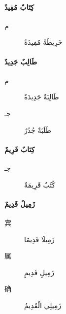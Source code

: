 \begin{Arabic}
    \begin{multicols}{3}
    \begin{minipage}{\linewidth}
    \paragraph{كِتَابٌ مُفِيدٌ}
    \begin{description}
        \item [م] خَرِيطَةٌ مُفِيدَةٌ
    \end{description}
    \end{minipage}

    \begin{minipage}{\linewidth}
    \paragraph{طَالِبٌ جَدِيدٌ}
    \begin{description}
        \item [م] طَالِبَةٌ جَدِيدَةٌ
        \item [جـ] طَلَبَةٌ جُدُرٌ
    \end{description}
    \end{minipage}

    \begin{minipage}{\linewidth}
    \paragraph{كِتَابٌ قَرِيمٌ}
    \begin{description}
        \item [جـ] كُتُبٌ قَرِيمَةٌ
    \end{description}
    \end{minipage}

    \begin{minipage}{\linewidth}
    \paragraph{زَمِيلٌ قَدِيمٌ}
    \begin{description}
        \item [宾] زَمِيلََا قَدِيمََا
        \item [属] زَمِيلِِ قَدِيمِِ
        \item [确] زَمِيلِي الْقَدِيمُ
    \end{description}
    \end{minipage}


\end{multicols}
\end{Arabic}
